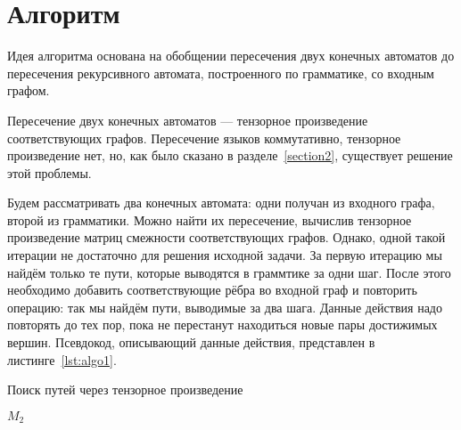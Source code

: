 \section{Алгоритм}

Идея алгоритма основана на обобщении пересечения двух конечных автоматов до пересечения рекурсивного автомата, построенного по грамматике, со входным графом.

Пересечение двух конечных автоматов --- тензорное произведение соответствующих графов.
Пересечение языков коммутативно, тензорное произведение нет, но, как было сказано в разделе~\ref{section2}, существует решение этой проблемы.

Будем рассматривать два конечных автомата: одни получан из входного графа, второй из грамматики. 
Можно найти их пересечение, вычислив тензорное произведение матриц смежности соответствующих графов.
Однако, одной такой итерации не достаточно для решения исходной задачи. За первую итерацию мы найдём только те пути, которые выводятся в граммтике за одни шаг. После этого необходимо добавить соответствующие рёбра во входной граф и повторить операцию: так мы найдём пути, выводимые за два шага. Данные действия надо повторять до тех пор, пока не перестанут находиться новые пары достижимых вершин.
Псевдокод, описывающий данные действия, представлен в листинге~\ref{lst:algo1}.

\begin{algorithm}
\begin{algorithmic}[1]
\caption{Поиск путей через тензорное произведение}
\label{lst:algo1}
       \EndIf
    \EndFor
                    \EndIf
                \EndIf
           \EndFor
        \EndFor
    \EndWhile
\State \Return $M_2$
\EndFunction
\end{algorithmic}
\end{algorithm}


